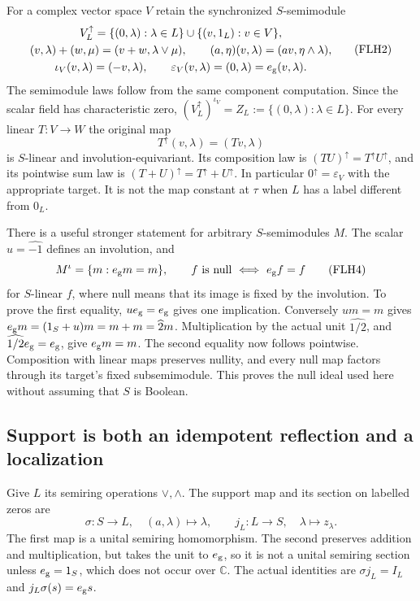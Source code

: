 For a complex vector space \(V\) retain the synchronized
\(S\)-semimodule
\[
\begin{gathered}
V_L^\uparrow
=\{(0,\lambda):\lambda\in L\}
       \cup\{(v,1_L):v\in V\},\\
(v,\lambda)+(w,\mu)=(v+w,\lambda\vee\mu),\qquad
(a,\eta)(v,\lambda)=(av,\eta\wedge\lambda),\\
\iota_V(v,\lambda)=(-v,\lambda),\qquad
\varepsilon_V(v,\lambda)=(0,\lambda)=e_{\rm g}(v,\lambda).
\end{gathered}\tag{FLH2}
\]
The semimodule laws follow from the same component computation.
Since the scalar field has characteristic zero,
\((V_L^\uparrow)^{\iota_V}=Z_L:=\{(0,\lambda):\lambda\in L\}\).
For every linear \(T:V\to W\) the original map
\[
T^\uparrow(v,\lambda)=(Tv,\lambda)
\tag{FLH3}
\]
is \(S\)-linear and involution-equivariant. Its composition law
is \((TU)^\uparrow=T^\uparrow U^\uparrow\), and its pointwise
sum law is \((T+U)^\uparrow=T^\uparrow+U^\uparrow\).
In particular \(0^\uparrow=\varepsilon_V\) with the appropriate
target. It is not the map constant at \(\tau\) when \(L\)
has a label different from \(0_L\).

There is a useful stronger statement for arbitrary
\(S\)-semimodules \(M\). The scalar \(u=\widehat{-1}\) defines
an involution, and
\[
M^\iota=\{m:e_{\rm g}m=m\},\qquad
f\text{ is null}\ \Longleftrightarrow\
e_{\rm g}f=f
\tag{FLH4}
\]
for \(S\)-linear \(f\), where null means that its image is fixed
by the involution. To prove the first equality, \(u e_{\rm g}
=e_{\rm g}\) gives one implication. Conversely \(um=m\)
gives \(e_{\rm g}m=(1_S+u)m=m+m=\widehat2m\).
Multiplication by the actual unit \(\widehat{1/2}\), and
\(\widehat{1/2}e_{\rm g}=e_{\rm g}\), give \(e_{\rm g}m=m\).
The second equality now follows pointwise. Composition with
linear maps preserves nullity, and every null map factors
through its target's fixed subsemimodule. This proves the
null ideal used here without assuming that \(S\) is Boolean.

\subsection{Support is both an idempotent reflection and a localization}

Give \(L\) its semiring operations \(\vee,\wedge\). The support
map and its section on labelled zeros are
\[
\sigma:S\longrightarrow L,\quad (a,\lambda)\longmapsto\lambda,
\qquad
j_L:L\longrightarrow S,\quad\lambda\longmapsto z_\lambda.
\tag{FLH5}
\]
The first map is a unital semiring homomorphism. The second
preserves addition and multiplication, but takes the unit to
\(e_{\rm g}\), so it is not a unital semiring section unless
\(e_{\rm g}=1_S\), which does not occur over \(\mathbb C\).
The actual identities are
\(\sigma j_L=I_L\) and \(j_L\sigma(s)=e_{\rm g}s\).

